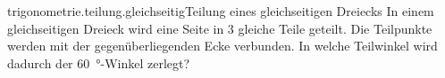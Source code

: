 \begin{exercise}{trigonometrie.teilung.gleichseitig}{Teilung eines gleichseitigen Dreiecks}
  \ifproblem\problem
    In einem gleichseitigen Dreieck wird eine Seite in 3 gleiche Teile geteilt.
    Die Teilpunkte werden mit der gegenüberliegenden Ecke verbunden. In welche
    Teilwinkel wird dadurch der \SI{60}{\degree}-Winkel zerlegt?
  \fi
\end{exercise}
